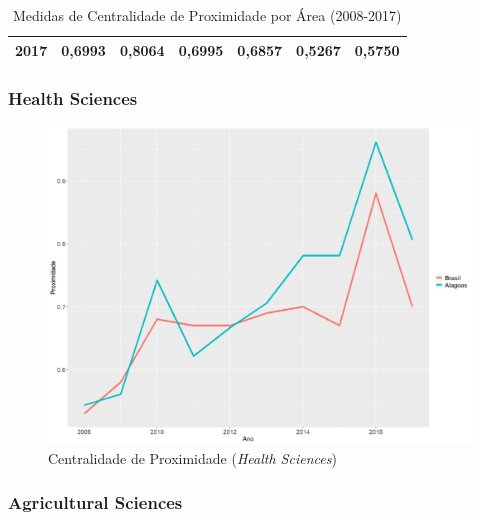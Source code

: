 \begin{table}[H]
\begin{tabular}{|c|l|l|l|l|l|l|}
		2017            & 0,6993                                                 & 0,8064                                                  & 0,6995                                                    & 0,6857                                                     & 0,5267                                                      & 0,5750                                                       \\ \hline
	\end{tabular}
\caption{Medidas de Centralidade de Proximidade por Área (2008-2017)}
\label{closeness-tab}
\end{table}


\subsubsection{Health Sciences}

\begin{figure}[H]
	\centering
	\includegraphics[scale=0.4]{Imagens/graf-linha-closeness-br-al.pdf}
	\caption{Centralidade de Proximidade (\textit{Health Sciences})}
	\label{close-health-1}
\end{figure}

\subsubsection{Agricultural Sciences}

